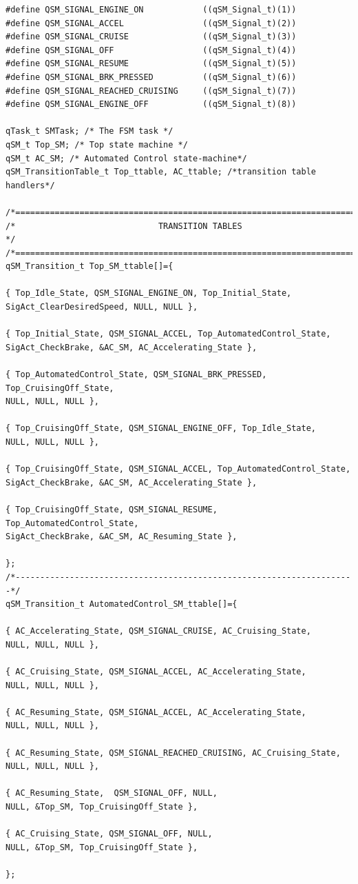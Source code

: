 \documentclass{article}
\begin{document}
\begin{lstlisting}[style=CStyle]
#define QSM_SIGNAL_ENGINE_ON            ((qSM_Signal_t)(1))
#define QSM_SIGNAL_ACCEL                ((qSM_Signal_t)(2))
#define QSM_SIGNAL_CRUISE               ((qSM_Signal_t)(3))
#define QSM_SIGNAL_OFF                  ((qSM_Signal_t)(4))
#define QSM_SIGNAL_RESUME               ((qSM_Signal_t)(5))
#define QSM_SIGNAL_BRK_PRESSED          ((qSM_Signal_t)(6))
#define QSM_SIGNAL_REACHED_CRUISING     ((qSM_Signal_t)(7))
#define QSM_SIGNAL_ENGINE_OFF           ((qSM_Signal_t)(8))

qTask_t SMTask; /* The FSM task */
qSM_t Top_SM; /* Top state machine */
qSM_t AC_SM; /* Automated Control state-machine*/
qSM_TransitionTable_t Top_ttable, AC_ttable; /*transition table handlers*/

/*=======================================================================*/
/*                             TRANSITION TABLES                         */
/*=======================================================================*/
qSM_Transition_t Top_SM_ttable[]={

{ Top_Idle_State, QSM_SIGNAL_ENGINE_ON, Top_Initial_State,  
SigAct_ClearDesiredSpeed, NULL, NULL },

{ Top_Initial_State, QSM_SIGNAL_ACCEL, Top_AutomatedControl_State, 
SigAct_CheckBrake, &AC_SM, AC_Accelerating_State },

{ Top_AutomatedControl_State, QSM_SIGNAL_BRK_PRESSED, Top_CruisingOff_State, 
NULL, NULL, NULL },

{ Top_CruisingOff_State, QSM_SIGNAL_ENGINE_OFF, Top_Idle_State, 
NULL, NULL, NULL },

{ Top_CruisingOff_State, QSM_SIGNAL_ACCEL, Top_AutomatedControl_State, 
SigAct_CheckBrake, &AC_SM, AC_Accelerating_State },

{ Top_CruisingOff_State, QSM_SIGNAL_RESUME, Top_AutomatedControl_State, 
SigAct_CheckBrake, &AC_SM, AC_Resuming_State },

};
/*---------------------------------------------------------------------*/
qSM_Transition_t AutomatedControl_SM_ttable[]={

{ AC_Accelerating_State, QSM_SIGNAL_CRUISE, AC_Cruising_State,
NULL, NULL, NULL },

{ AC_Cruising_State, QSM_SIGNAL_ACCEL, AC_Accelerating_State,
NULL, NULL, NULL },

{ AC_Resuming_State, QSM_SIGNAL_ACCEL, AC_Accelerating_State, 
NULL, NULL, NULL },

{ AC_Resuming_State, QSM_SIGNAL_REACHED_CRUISING, AC_Cruising_State,
NULL, NULL, NULL },

{ AC_Resuming_State,  QSM_SIGNAL_OFF, NULL,  
NULL, &Top_SM, Top_CruisingOff_State },    

{ AC_Cruising_State, QSM_SIGNAL_OFF, NULL, 
NULL, &Top_SM, Top_CruisingOff_State },    

};
\end{lstlisting}
\end{document}
